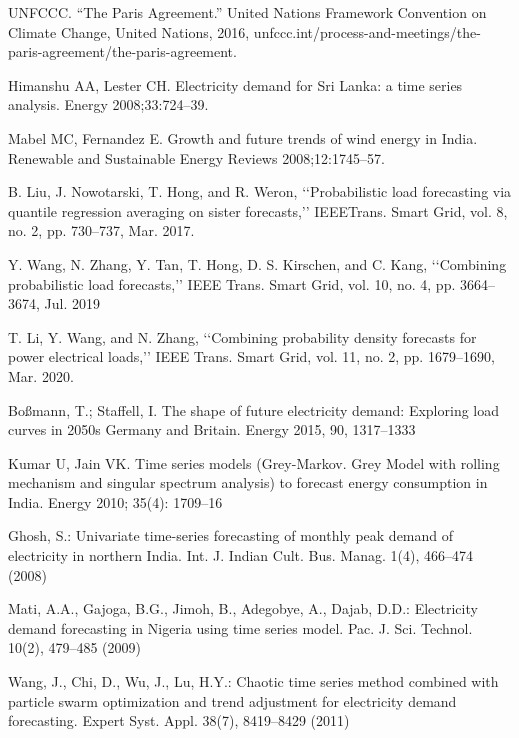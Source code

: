 \documentclass[lettersize,journal]{IEEEtran}
\begin{document}
\begin{thebibliography}{1}
  
  UNFCCC. “The Paris Agreement.” United Nations Framework Convention on Climate Change, United Nations, 2016, unfccc.int/process-and-meetings/the-paris-agreement/the-paris-agreement.
  
  Himanshu AA, Lester CH. Electricity demand for Sri Lanka: a time series analysis. Energy 2008;33:724–39.

  Mabel MC, Fernandez E. Growth and future trends of wind energy in India. Renewable and Sustainable Energy Reviews 2008;12:1745–57.

  B. Liu, J. Nowotarski, T. Hong, and R. Weron, ‘‘Probabilistic load forecasting via quantile regression averaging on sister forecasts,’’ IEEETrans. Smart Grid, vol. 8, no. 2, pp. 730–737, Mar. 2017.

  Y. Wang, N. Zhang, Y. Tan, T. Hong, D. S. Kirschen, and C. Kang, ‘‘Combining probabilistic load forecasts,’’ IEEE Trans. Smart Grid, vol. 10, no. 4, pp. 3664–3674, Jul. 2019

  T. Li, Y. Wang, and N. Zhang, ‘‘Combining probability density forecasts for power electrical loads,’’ IEEE Trans. Smart Grid, vol. 11, no. 2, pp. 1679–1690, Mar. 2020.

  Boßmann, T.; Staffell, I. The shape of future electricity demand: Exploring load curves in 2050s Germany and Britain. Energy 2015, 90, 1317–1333


  Kumar U, Jain VK. Time series models (Grey-Markov. Grey Model with rolling mechanism and singular spectrum analysis) to forecast energy consumption in India. Energy 2010; 35(4): 1709–16

  Ghosh, S.: Univariate time-series forecasting of monthly peak demand of electricity in northern India. Int. J. Indian Cult. Bus. Manag. 1(4), 466–474 (2008)

  Mati, A.A., Gajoga, B.G., Jimoh, B., Adegobye, A., Dajab, D.D.: Electricity demand forecasting in Nigeria using time series model. Pac. J. Sci. Technol. 10(2), 479–485 (2009)

  Wang, J., Chi, D., Wu, J., Lu, H.Y.: Chaotic time series method combined with particle swarm optimization and trend adjustment for electricity demand forecasting. Expert Syst. Appl. 38(7), 8419–8429 (2011)


\end{thebibliography}
\end{document}
